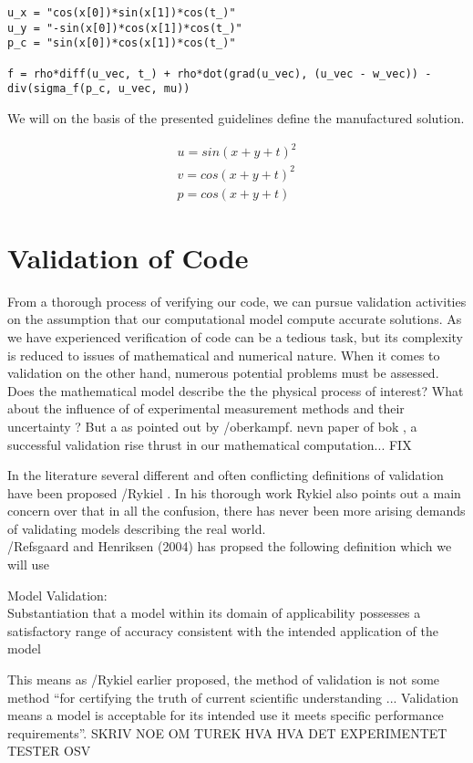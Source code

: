 \begin{lstlisting}[style=python, caption={Descriptive Caption Text}, label=DescriptiveLabel, frame=single]
u_x = "cos(x[0])*sin(x[1])*cos(t_)"
u_y = "-sin(x[0])*cos(x[1])*cos(t_)"
p_c = "sin(x[0])*cos(x[1])*cos(t_)"

f = rho*diff(u_vec, t_) + rho*dot(grad(u_vec), (u_vec - w_vec)) -
div(sigma_f(p_c, u_vec, mu))
\end{lstlisting}

We will on the basis of the presented guidelines define the manufactured solution.

\begin{align*}
u = sin(x + y + t)^2 \\
v = cos(x + y +  t)^2 \\
p = cos(x + y + t)
\end{align*}

\newpage                                                                                                                                             
\section{Validation of Code}
From a thorough process of verifying our code, we can pursue validation activities on the assumption that our computational model compute accurate solutions. As we have experienced verification of code can be a tedious task, but its complexity is reduced to issues of mathematical and numerical nature. When it comes to validation on the other hand, numerous potential problems must be assessed.  Does the mathematical model describe the the physical process of interest? What about the influence of of experimental measurement methods and their uncertainty ? But a as pointed out by /oberkampf. nevn paper of bok , a  successful validation rise thrust in our mathematical computation... FIX

In the literature several different and often conflicting definitions of validation have been proposed /Rykiel . In his thorough work Rykiel also points out a main concern over that in all the confusion, there has never been more arising demands of validating models describing the real world. \\

/Refsgaard and Henriksen (2004) has propsed the following definition which we will use  

\begin{defn} 
Model Validation: \\Substantiation that a model within its domain of applicability possesses a satisfactory range of accuracy consistent with the intended application of the model
\end{defn}

This means as /Rykiel earlier proposed, the method of validation is not some method ``for certifying the truth of current scientific understanding ... Validation means a model is acceptable for its intended use it meets specific performance requirements''.  SKRIV NOE OM TUREK HVA HVA DET EXPERIMENTET TESTER OSV

 

